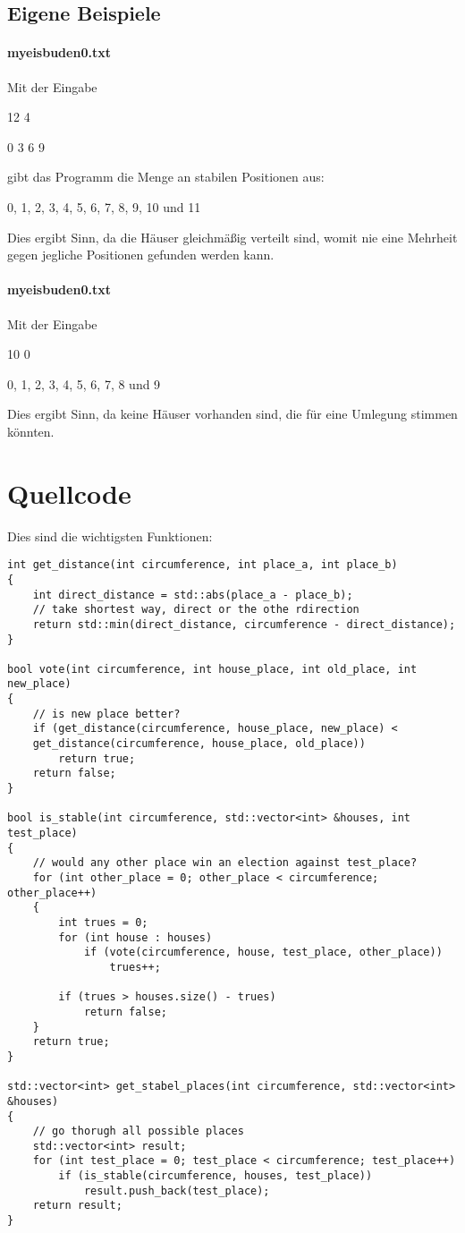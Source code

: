 \documentclass[a4paper,10pt,ngerman]{scrartcl}
\begin{document}
\subsection{Eigene Beispiele}

\paragraph{myeisbuden0.txt}
Mit der Eingabe

12 4

0 3 6 9

gibt das Programm die Menge an stabilen Positionen aus:

0, 1, 2, 3, 4, 5, 6, 7, 8, 9, 10 und 11

Dies ergibt Sinn, da die Häuser gleichmäßig verteilt sind, womit nie eine Mehrheit gegen jegliche Positionen gefunden werden kann.

\paragraph{myeisbuden0.txt}
Mit der Eingabe

10 0


0, 1, 2, 3, 4, 5, 6, 7, 8 und 9

Dies ergibt Sinn, da keine Häuser vorhanden sind, die für eine Umlegung stimmen könnten.

\section{Quellcode}
Dies sind die wichtigsten Funktionen:
\begin{lstlisting}
int get_distance(int circumference, int place_a, int place_b)
{
    int direct_distance = std::abs(place_a - place_b);
    // take shortest way, direct or the othe rdirection
    return std::min(direct_distance, circumference - direct_distance);
}

bool vote(int circumference, int house_place, int old_place, int new_place)
{
    // is new place better?
    if (get_distance(circumference, house_place, new_place) <
    get_distance(circumference, house_place, old_place))
        return true;
    return false;
}

bool is_stable(int circumference, std::vector<int> &houses, int test_place)
{
    // would any other place win an election against test_place?
    for (int other_place = 0; other_place < circumference; other_place++)
    {
        int trues = 0;
        for (int house : houses)
            if (vote(circumference, house, test_place, other_place))
                trues++;

        if (trues > houses.size() - trues)
            return false;
    }
    return true;
}

std::vector<int> get_stabel_places(int circumference, std::vector<int> &houses)
{
    // go thorugh all possible places
    std::vector<int> result;
    for (int test_place = 0; test_place < circumference; test_place++)
        if (is_stable(circumference, houses, test_place))
            result.push_back(test_place);
    return result;
}
\end{lstlisting}
\end{document}
